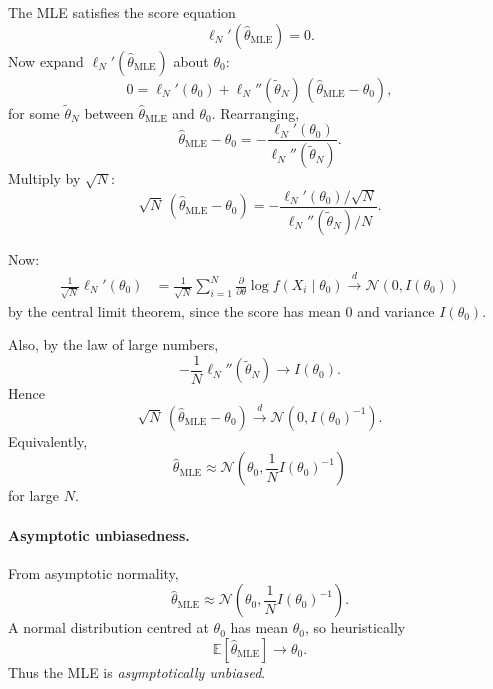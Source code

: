 \documentclass[11pt, titlepage]{article} %
\numberwithin{equation}{section}
\theoremstyle{definition}
\numberwithin{assumption}{section}
\begin{document}
The MLE satisfies the score equation
\begin{equation*}
    \ell_N'(\hat{\theta}_{\mathrm{MLE}})=0.
\end{equation*}
Now expand $\ell_N'(\hat{\theta}_{\mathrm{MLE}})$ about $\theta_0$:
\begin{equation*}
    0
    =
    \ell_N'(\theta_0)
    +
    \ell_N''(\tilde{\theta}_N)\,
    (\hat{\theta}_{\mathrm{MLE}}-\theta_0),
\end{equation*}
for some $\tilde{\theta}_N$ between $\hat{\theta}_{\mathrm{MLE}}$ and $\theta_0$. Rearranging,
\begin{equation*}
    \hat{\theta}_{\mathrm{MLE}}-\theta_0
    =
    -\frac{\ell_N'(\theta_0)}{\ell_N''(\tilde{\theta}_N)}.
\end{equation*}
Multiply by $\sqrt{N}$:
\begin{equation*}
    \sqrt{N}\,(\hat{\theta}_{\mathrm{MLE}}-\theta_0)
    =
    -\frac{\ell_N'(\theta_0)/\sqrt{N}}{\ell_N''(\tilde{\theta}_N)/N}.
\end{equation*}

Now:
\begin{align*}
    \frac{1}{\sqrt{N}}\ell_N'(\theta_0)
    &= \frac{1}{\sqrt{N}}\sum_{i=1}^N \frac{\partial}{\partial \theta}\log f(X_i\mid \theta_0)
    \overset{d}{\longrightarrow} \mathcal{N}(0,I(\theta_0))
\end{align*}
by the central limit theorem, since the score has mean $0$ and variance $I(\theta_0)$.

Also, by the law of large numbers,
\begin{equation*}
    -\frac{1}{N}\ell_N''(\tilde{\theta}_N)\to I(\theta_0).
\end{equation*}
Hence
\begin{equation*}
    \sqrt{N}\,(\hat{\theta}_{\mathrm{MLE}}-\theta_0)
    \overset{d}{\longrightarrow}
    \mathcal{N}(0,I(\theta_0)^{-1}).
\end{equation*}
Equivalently,
\begin{equation*}
    \hat{\theta}_{\mathrm{MLE}}
    \approx
    \mathcal{N}\!\left(\theta_0,\frac{1}{N}I(\theta_0)^{-1}\right)
\end{equation*}
for large $N$.

\paragraph{Asymptotic unbiasedness.}

From asymptotic normality,
\begin{equation*}
    \hat{\theta}_{\mathrm{MLE}}
    \approx
    \mathcal{N}\!\left(\theta_0,\frac{1}{N}I(\theta_0)^{-1}\right).
\end{equation*}
A normal distribution centred at $\theta_0$ has mean $\theta_0$, so heuristically
\begin{equation*}
    \mathbb{E}[\hat{\theta}_{\mathrm{MLE}}]\to \theta_0.
\end{equation*}
Thus the MLE is \textit{asymptotically unbiased}. 
\end{document}
